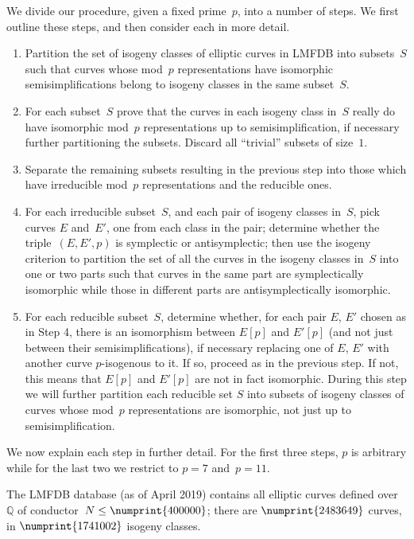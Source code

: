 \documentclass[12pt]{amsart}
\newcommand{\Q}{\mathbb{Q}}
\numberwithin{equation}{section}
\theoremstyle{definition}
\theoremstyle{remark}
\begin{document}
We divide our procedure, given a fixed prime~$p$, into a number of
steps.  We first outline these steps, and then consider each in more detail.
\begin{enumerate}[1.]
\item Partition the set of isogeny classes of elliptic curves in LMFDB
  into subsets~$S$ such that curves whose mod~$p$ representations have
  isomorphic semisimplifications belong to isogeny classes in the same
  subset~$S$.
\item For each subset~$S$ prove that the curves in each isogeny class in~$S$ really
  do have isomorphic mod~$p$ representations up to
  semisimplification, if necessary further partitioning the subsets.
  Discard all ``trivial'' subsets of size~$1$.
\item Separate the remaining subsets resulting in the previous
  step into those which have irreducible mod~$p$ representations and
  the reducible ones.
\item For each irreducible subset~$S$, and each pair of isogeny
  classes in~$S$, pick curves $E$ and~$E'$, one from each class in the
  pair; determine whether the triple~$(E,E',p)$ is symplectic or
  antisymplectic; then use the  isogeny criterion to partition the set
  of all the curves in the isogeny classes in~$S$ into one or two
  parts such that curves in the same part are symplectically
  isomorphic while those in different parts are antisymplectically
  isomorphic.
\item For each reducible subset~$S$, determine whether, for each pair
  $E$, $E'$ chosen as in Step 4, there is an isomorphism between
  $E[p]$ and $E'[p]$ (and not just between their semisimplifications),
  if necessary replacing one of $E$, $E'$ with another curve
  $p$-isogenous to it.  If so, proceed as in the previous step.  If
  not, this means that $E[p]$ and $E'[p]$ are not in fact isomorphic.
  During this step we will further partition each reducible set $S$
  into subsets of isogeny classes of curves whose mod~$p$
  representations are isomorphic, not just up to semisimplification.
\end{enumerate}
We now explain each step in further detail.  For the first three
steps, $p$ is arbitrary while for the last two we restrict to $p=7$
and~$p=11$.

The LMFDB database (as of April 2019) contains all elliptic curves
defined over~$\Q$ of conductor~$N\le\numprint{400000}$; there are $\numprint{2483649}$
curves, in $\numprint{1741002}$ isogeny classes.
\end{document}
